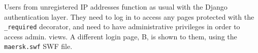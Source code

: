 Users from unregistered IP addresses function as usual with the
Django authentication layer. They need to log in to access any
pages protected with the {\tt \@login\_required} decorator, and
need to have administrative privileges in order to access
admin. views. A different login page, B, is shown to them, using
the {\tt maersk.swf} SWF file.
